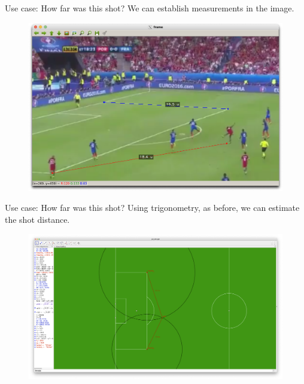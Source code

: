 \begin{frame}{\secname}{Use case: How far was this shot?}
    We can establish measurements in the image.
    \begin{figure}
        \includegraphics[width=0.7\textheight]{img/Medida_HomogOrig_Final}
    \end{figure}
\end{frame}

\begin{frame}{\secname}{Use case: How far was this shot?}
    Using trigonometry, as before, we can estimate the shot distance.
    \begin{figure}
        \includegraphics[width=\textwidth]{img/posicion-eder}
    \end{figure}
\end{frame}

